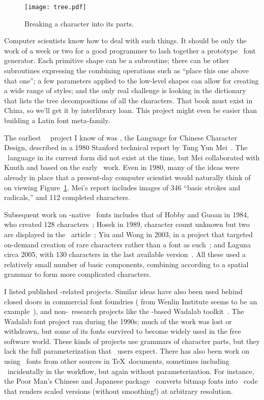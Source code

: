 \documentclass{ltugboat}
\begin{document}
\begin{figure}
\texttt{[image: tree.pdf]}
\caption{Breaking a character into its parts.}
\label{fig:tree}
\end{figure}

Computer scientists know how to deal with such things.  It should be only
the work of a week or two for a good programmer to lash together a prototype
\CJK\ font generator.  Each primitive shape can be a subroutine; there can
be other subroutines expressing the combining operations such as ``place
this one above that one''; a few parameters applied to the low-level shapes
can allow for creating a wide range of styles; and the only real challenge
is looking in the dictionary that lists the tree decompositions of all the
characters.  That book must exist in China, so we'll get it by interlibrary
loan.  This project might even be easier than building a Latin font
meta-family.

The earliest \MF\ \CJK\ project I know of was , the Language for
Chinese Character Design, described in a 1980 Stanford technical report by
Tung Yun Mei~\cite{Mei:LCCD}.  The \MF\ language in its current form did not
exist at the time, but Mei collaborated with Knuth and based  on
the early \MF\ work.  Even in 1980, many of the ideas were already in place
that a present-day computer scientist would naturally think of on viewing
Figure~\ref{fig:tree}.  Mei's report includes images of 346 ``basic strokes
and radicals,'' and 112 completed characters.

Subsequent work on \MF-native \CJK\ fonts includes that of Hobby and Guoan
in 1984, who created 128 characters~\cite{Hobby:Chinese}; Hosek in 1989,
character count unknown but two are displayed in the \TUB\
article~\cite{Hosek:Design}; Yiu and Wong in 2003, in a project that
targeted on-demand creation of rare characters rather than a font as
such~\cite{Yiu:Chinese}; and Laguna circa 2005, with 130 characters in the
last available version~\cite{Laguna:Hong}.  All these used a relatively
small number of basic components, combining according to a spatial grammar
to form more complicated characters.

I listed published \MF-related projects.  Similar ideas have also been used
behind closed doors in commercial font foundries (\acro{CDL} from Wenlin
Institute seems to be an example~\cite{Wenlin:CDL}), and non-\MF\ research
projects like the \acro{LISP}-based Wadalab toolkit~\cite{Tanaka:Wadalab}. 
The Wadalab font project ran during the 1990s; much of the work was lost or
withdrawn, but some of its fonts survived to become widely used
in the free software world.  These kinds of projects use grammars of
character parts, but they lack the full parameterization that \MF\ users
expect.  There has also been work on using \CJK\ fonts from other sources in
\TeX\ documents, sometimes including \MF\ incidentally in the workflow, but
again without parameterization.  For instance, the Poor Man's Chinese and
Japanese package~\cite{Ridgeway:Poor} converts bitmap fonts into \MF\ code
that renders scaled versions (without smoothing!) at arbitrary resolution.
\end{document}
